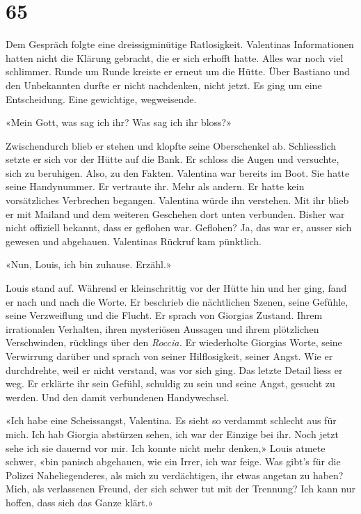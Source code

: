 \chapter{65}



Dem Gespräch folgte eine dreissigminütige Ratlosigkeit. Valentinas Informationen hatten nicht die Klärung gebracht,
die er sich erhofft hatte. Alles war noch viel schlimmer. Runde um Runde kreiste er erneut um die Hütte. Über Bastiano und den
Unbekannten durfte er nicht nachdenken, nicht jetzt. Es ging um eine Entscheidung. Eine gewichtige, wegweisende.

 
«Mein Gott, was sag ich ihr? Was sag ich ihr bloss?»

Zwischendurch blieb er stehen und klopfte seine Oberschenkel ab. Schliesslich setzte er sich vor der Hütte auf die Bank. Er schloss die Augen und versuchte, sich zu beruhigen. Also, zu den Fakten. Valentina war bereits im Boot. Sie hatte seine Handynummer. Er vertraute ihr. Mehr als andern. Er hatte kein vorsätzliches Verbrechen begangen. 
Valentina würde ihn verstehen. Mit ihr blieb er mit Mailand und dem
weiteren Geschehen dort unten verbunden. Bisher war nicht offiziell
bekannt, dass er geflohen war. Geflohen? Ja, das war er, ausser sich
gewesen und abgehauen.
Valentinas Rückruf kam pünktlich.

«Nun, Louis, ich bin zuhause. Erzähl.»

Louis stand auf. Während er kleinschrittig vor der Hütte hin und her ging, 
fand er nach und nach die Worte. Er beschrieb die nächtlichen Szenen,
seine Gefühle, seine Verzweiflung und die Flucht. Er sprach von Giorgias
Zustand. Ihrem irrationalen Verhalten, ihren mysteriösen Aussagen und
ihrem plötzlichen Verschwinden, rücklings über den \emph{Roccia.} Er
wiederholte Giorgias Worte, seine Verwirrung darüber und sprach von
seiner Hilflosigkeit, seiner Angst. Wie er durchdrehte, weil er nicht
verstand, was vor sich ging. Das letzte Detail liess er weg.  Er
erklärte ihr sein Gefühl, schuldig zu sein und seine Angst, gesucht zu
werden. Und den damit verbundenen Handywechsel.

«Ich habe eine Scheissangst, Valentina. Es sieht so verdammt schlecht
aus für mich. Ich hab Giorgia abstürzen sehen, ich war der Einzige bei
ihr. Noch jetzt sehe ich sie dauernd vor mir. Ich konnte nicht mehr
denken,» Louis atmete schwer, «bin panisch abgehauen, wie ein Irrer, ich
war feige. Was gibt’s für die Polizei Naheliegenderes, als mich zu
verdächtigen, ihr etwas angetan zu haben? Mich, als verlassenen Freund, der sich schwer tut mit der
Trennung? Ich kann nur hoffen, dass sich das Ganze klärt.»

